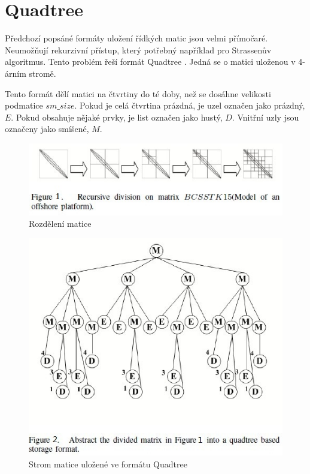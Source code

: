 \section{Quadtree}

Předchozí popsáné formáty uložení řídkých matic jsou velmi přímočaré. Neumožňují rekurzivní přístup, který potřebný například pro Strassenův algoritmus. Tento problém řeší formát Quadtree \cite{JA_SNA_08_QUAD}\cite{qdtsf}. Jedná se o matici uloženou v 4-árním stromě.

Tento formát dělí matici na čtvrtiny do té doby, než se dosáhne velikosti podmatice $sm\_size$. Pokud je celá čtvrtina prázdná, je uzel označen jako prázdný, $E$. Pokud obsahuje nějaké prvky, je list označen jako hustý, $D$. Vnitřní uzly jsou označeny jako smíšené, $M$.

\begin{figure}[H]\centering
	\includegraphics[width=\textwidth]{./images/quadtree_sourceforge/figure4}
	\caption{Rozdělení matice}
	\label{fig:BSR}
\end{figure}

\begin{figure}[H]\centering
	\includegraphics[width=\textwidth]{./images/quadtree_sourceforge/figure5}
	\caption{Strom matice uložené ve formátu Quadtree}
	\label{fig:BSR}
\end{figure}

